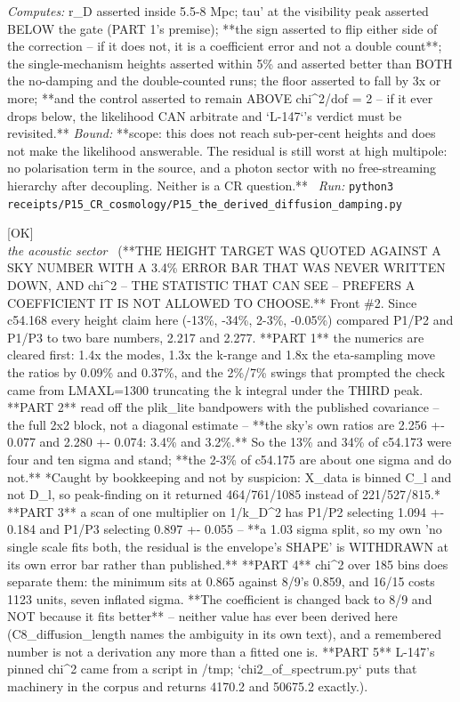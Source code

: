 \begin{description}
\emph{Computes:} r\_D asserted inside 5.5-8 Mpc; tau' at the visibility peak asserted BELOW the gate (PART 1's premise); **the sign asserted to flip either side of the correction -- if it does not, it is a coefficient error and not a double count**; the single-mechanism heights asserted within 5\% and asserted better than BOTH the no-damping and the double-counted runs; the floor asserted to fall by 3x or more; **and the control asserted to remain ABOVE chi\textasciicircum{}2/dof = 2 -- if it ever drops below, the likelihood CAN arbitrate and `L-147`'s verdict must be revisited.**
 \emph{Bound:} **scope: this does not reach sub-per-cent heights and does not make the likelihood answerable. The residual is still worst at high multipole: no polarisation term in the source, and a photon sector with no free-streaming hierarchy after decoupling. Neither is a CR question.**
\ \emph{Run:} \texttt{python3 receipts/P15\_CR\_cosmology/P15\_the\_derived\_diffusion\_damping.py}
\item[\rcptlabel{P15_the_height_target_was_below_the_resolution_of_its_own_statistic}{P15R70}\textbf{P15R70}\quad\texttt{P15\_the\_height\_target\_was\_below\_the\_resolution\_of\_its\_own\_statistic}]\hfill\textsf{[OK]}\\
\textit{the acoustic sector} \ (**THE HEIGHT TARGET WAS QUOTED AGAINST A SKY NUMBER WITH A 3.4\% ERROR BAR THAT WAS NEVER WRITTEN DOWN, AND chi\textasciicircum{}2 -- THE STATISTIC THAT CAN SEE -- PREFERS A COEFFICIENT IT IS NOT ALLOWED TO CHOOSE.** Front \#2. Since c54.168 every height claim here (-13\%, -34\%, 2-3\%, -0.05\%) compared P1/P2 and P1/P3 to two bare numbers, 2.217 and 2.277. **PART 1** the numerics are cleared first: 1.4x the modes, 1.3x the k-range and 1.8x the eta-sampling move the ratios by 0.09\% and 0.37\%, and the 2\%/7\% swings that prompted the check came from LMAXL=1300 truncating the k integral under the THIRD peak. **PART 2** read off the plik\_lite bandpowers with the published covariance -- the full 2x2 block, not a diagonal estimate -- **the sky's own ratios are 2.256 +- 0.077 and 2.280 +- 0.074: 3.4\% and 3.2\%.** So the 13\% and 34\% of c54.173 were four and ten sigma and stand; **the 2-3\% of c54.175 are about one sigma and do not.** *Caught by bookkeeping and not by suspicion: X\_data is binned C\_l and not D\_l, so peak-finding on it returned 464/761/1085 instead of 221/527/815.* **PART 3** a scan of one multiplier on 1/k\_D\textasciicircum{}2 has P1/P2 selecting 1.094 +- 0.184 and P1/P3 selecting 0.897 +- 0.055 -- **a 1.03 sigma split, so my own 'no single scale fits both, the residual is the envelope's SHAPE' is WITHDRAWN at its own error bar rather than published.** **PART 4** chi\textasciicircum{}2 over 185 bins does separate them: the minimum sits at 0.865 against 8/9's 0.859, and 16/15 costs 1123 units, seven inflated sigma. **The coefficient is changed back to 8/9 and NOT because it fits better** -- neither value has ever been derived here (C8\_diffusion\_length names the ambiguity in its own text), and a remembered number is not a derivation any more than a fitted one is. **PART 5** L-147's pinned chi\textasciicircum{}2 came from a script in /tmp; `chi2\_of\_spectrum.py` puts that machinery in the corpus and returns 4170.2 and 50675.2 exactly.). 

\end{description}
